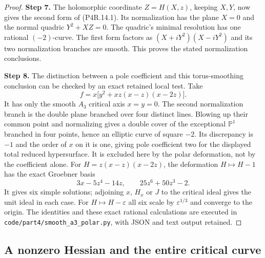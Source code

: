 \begin{proof}
\noindent\textbf{Step 7.} The holomorphic coordinate $Z=H(X,z)$, keeping $X,Y$, now
gives the second form of (P4R.14.1). Its normalization has
the plane $X=0$ and the normal quadric $Y^2+XZ=0$. The
quadric's minimal resolution has one rational $(-2)$-curve.
The first form factors as $(X+iY^2)(X-iY^2)$ and its two
normalization branches are smooth. This proves the stated
normalization conclusions.

\noindent\textbf{Step 8.} The distinction between a pole coefficient and this
torus-smoothing conclusion can be checked by an exact
retained local test. Take
\[
 f=x\bigl[y^2+xz(x-z)(x-2z)\bigr].
\]
It has only the smooth $A_3$ critical axis $x=y=0$. The
second normalization branch is the double plane branched
over four distinct lines. Blowing up their common point
and normalizing gives a double cover of the exceptional
$\mathbb P^1$ branched in four points, hence an elliptic
curve of square $-2$. Its discrepancy is $-1$ and the
order of $x$ on it is one, giving pole coefficient two
for the displayed total reduced hypersurface. It is excluded
here by the polar deformation, not by the coefficient alone.
For $H=z(x-z)(x-2z)$, the deformation $H\mapsto H-1$ has
the exact Groebner basis
\[
 3x-5z^4-14z,\qquad 25z^6+50z^3-2.
\]
It gives six simple solutions; adjoining $x$, $H_x$ or
$J$ to the critical ideal gives the unit ideal in each
case. For $H\mapsto H-\varepsilon$ all six scale by
$\varepsilon^{1/3}$ and converge to the origin. The
identities and these exact rational calculations are
executed in \texttt{code/part4/smooth\_a3\_polar.py},
with JSON and text output retained.
\end{proof}

\subsection{A nonzero Hessian and the entire critical curve}

